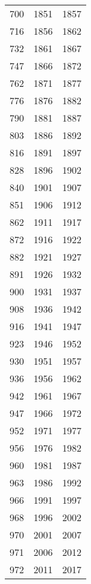 \begin{tabular}{rrr}
  700 & 1851 & 1857 \\ 
  716 & 1856 & 1862 \\ 
  732 & 1861 & 1867 \\ 
  747 & 1866 & 1872 \\ 
  762 & 1871 & 1877 \\ 
  776 & 1876 & 1882 \\ 
  790 & 1881 & 1887 \\ 
  803 & 1886 & 1892 \\ 
  816 & 1891 & 1897 \\ 
  828 & 1896 & 1902 \\ 
  840 & 1901 & 1907 \\ 
  851 & 1906 & 1912 \\ 
  862 & 1911 & 1917 \\ 
  872 & 1916 & 1922 \\ 
  882 & 1921 & 1927 \\ 
  891 & 1926 & 1932 \\ 
  900 & 1931 & 1937 \\ 
  908 & 1936 & 1942 \\ 
  916 & 1941 & 1947 \\ 
  923 & 1946 & 1952 \\ 
  930 & 1951 & 1957 \\ 
  936 & 1956 & 1962 \\ 
  942 & 1961 & 1967 \\ 
  947 & 1966 & 1972 \\ 
  952 & 1971 & 1977 \\ 
  956 & 1976 & 1982 \\ 
  960 & 1981 & 1987 \\ 
  963 & 1986 & 1992 \\ 
  966 & 1991 & 1997 \\ 
  968 & 1996 & 2002 \\ 
  970 & 2001 & 2007 \\ 
  971 & 2006 & 2012 \\ 
  972 & 2011 & 2017 \\ 
   \hline
\end{tabular}
